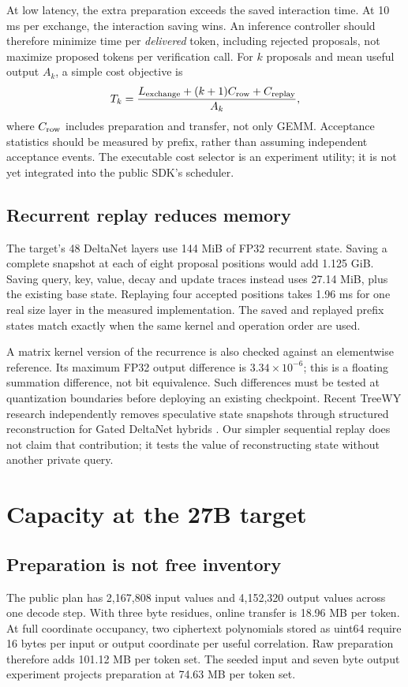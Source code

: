 \documentclass[10pt,twocolumn]{article}
\begin{document}
At low latency, the extra preparation exceeds the saved interaction time. At
10 ms per exchange, the interaction saving wins. An inference controller should
therefore minimize time per \emph{delivered} token, including rejected proposals,
not maximize proposed tokens per verification call. For $k$ proposals and
mean useful output $A_k$, a simple cost objective is
\begin{equation}
 T_k = \frac{L_{\rm exchange}+(k+1)C_{\rm row}+C_{\rm replay}}{A_k},
\end{equation}
where $C_{\rm row}$ includes preparation and transfer, not only GEMM. Acceptance
statistics should be measured by prefix, rather than assuming independent
acceptance events. The executable cost selector is an experiment utility; it
is not yet integrated into the public SDK's scheduler.

\subsection{Recurrent replay reduces memory}
The target's 48 DeltaNet layers use 144 MiB of FP32 recurrent state. Saving a
complete snapshot at each of eight proposal positions would add 1.125 GiB.
Saving query, key, value, decay and update traces instead uses 27.14 MiB, plus
the existing base state. Replaying four accepted positions takes 1.96 ms for
one real size layer in the measured implementation. The saved and replayed
prefix states match exactly when the same kernel and operation order are used.

A matrix kernel version of the recurrence is also checked against an elementwise
reference. Its maximum FP32 output difference is $3.34\times10^{-6}$; this is a
floating summation difference, not bit equivalence. Such differences must be
tested at quantization boundaries before deploying an existing checkpoint.
Recent TreeWY research independently removes speculative state snapshots through
structured reconstruction for Gated DeltaNet hybrids \cite{treewy}. Our simpler
sequential replay does not claim that contribution; it tests the value of
reconstructing state without another private query.

\section{Capacity at the 27B target}
\subsection{Preparation is not free inventory}
The public plan has 2,167,808 input values and 4,152,320 output values across one
decode step. With three byte residues, online transfer is 18.96 MB per token.
At full coordinate occupancy, two ciphertext polynomials stored as uint64
require 16 bytes per input or output coordinate per useful correlation.
Raw preparation therefore adds 101.12 MB per token set. The seeded input and
seven byte output experiment projects preparation at 74.63 MB per token set.
\end{document}
